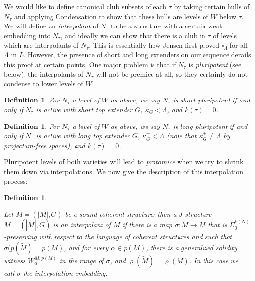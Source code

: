 \documentclass[12pt]{article}
\newtheorem{defn}[thm]{Definition}
\begin{document}
We would like to define canonical club subsets of each $\tau$ by taking certain hulls of $N_\tau$ and applying Condensation to show that these hulls are levels of $W$ below $\tau$.  We will define an \textit{interpolant} of $N_\tau$ to be a structure with a certain weak embedding into $N_\tau$, and ideally we can show that there is a club in $\tau$ of levels which are interpolants of $N_\tau$.  This is essentially how Jensen first proved $\square_\Lambda$ for all $\Lambda$ in $L$.  However, the presence of short and long extenders on our sequence derails this proof at certain points.  One major problem is that if $N_\tau$ is \textit{pluripotent} (see below), the interpolants of $N_\tau$ will not be premice at all, so they certainly do not condense to lower levels of $W$.\\


\begin{defn} \label{short pluripotent}
For $N_\tau$ a level of $W$ as above, we say $N_\tau$ is \textit{short pluripotent} if and only if $N_\tau$ is active with short top extender $G$, $\kappa_G < \Lambda$, and $k(\tau) = 0$.
\end{defn}

\begin{defn} \label{long pluripotent}
For $N_\tau$ a level of $W$ as above, we say $N_\tau$ is \textit{long pluripotent} if and only if $N_\tau$ is active with long top extender $G$, $\kappa_G^+ < \Lambda$ (note that $\kappa_G^+ \neq \Lambda$ by projectum-free spaces), and $k(\tau) = 0$.
\end{defn}

Pluripotent levels of both varieties will lead to \textit{protomice} when we try to shrink them down via interpolations.  We now give the description of this interpolation process:\\



\begin{defn} \label{interpolant}

Let $M = (|M| , G)$ be a sound coherent structure; then a $J$-structure $\tilde{M} = (| \tilde{M} | , \tilde{G})$ is an interpolant of $M$ if there is a map $\sigma : \tilde{M} \longrightarrow M$ that is $\Sigma_0^{k(N)}$-preserving with respect to the language of coherent structures and such that $\sigma (p (\tilde{M}) = p (M)$, and for every $\alpha \in p(M)$, there is a generalized solidity witness $W_\alpha^{M , p(M)}$ in the range of $\sigma$, and $\varrho (\tilde{M}) = \varrho (M)$.  In this case we call $\sigma$ the interpolation embedding.
\end{defn}
\end{document}
